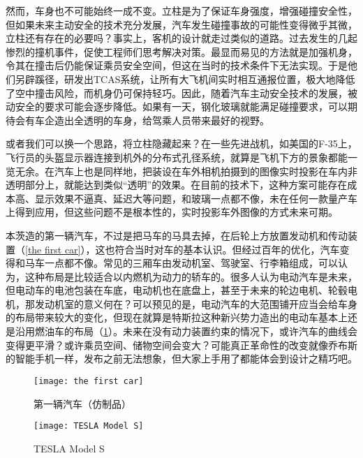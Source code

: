 \documentclass[UTF8]{ctexart}
\numberwithin{figure}{section}
\numberwithin{table}{section}
\begin{document}
然而，车身也不可能始终一成不变。立柱是为了保证车身强度，增强碰撞安全性，但如果未来主动安全的技术充分发展，汽车发生碰撞事故的可能性变得微乎其微，立柱还有存在的必要吗？事实上，客机的设计就走过类似的道路。过去发生的几起惨烈的撞机事件，促使工程师们思考解决对策。最显而易见的方法就是加强机身，令其在撞击后仍能保证乘员安全空间，但这在当时的技术条件下无法实现。于是他们另辟蹊径，研发出TCAS系统，让所有大飞机间实时相互通报位置，极大地降低了空中撞击风险，而机身仍可保持轻巧。因此，随着汽车主动安全技术的发展，被动安全的要求可能会逐步降低。如果有一天，钢化玻璃就能满足碰撞要求，可以期待会有车企造出全透明的车身，给驾乘人员带来最好的视野。

或者我们可以换一个思路，将立柱隐藏起来？在一些先进战机，如美国的F-35上，飞行员的头盔显示器连接到机外的分布式孔径系统，就算是飞机下方的景象都能一览无余。在汽车上也是同样地，把装设在车外相机拍摄到的图像实时投影在车内非透明部分上，就能达到类似“透明”的效果。在目前的技术下，这种方案可能存在成本高、显示效果不逼真、延迟大等问题，和玻璃一点都不像，未在任何一款量产车上得到应用，但这些问题不是根本性的，实时投影车外图像的方式未来可期。

本茨造的第一辆汽车，不过是把马车的马具去掉，在后轮上方放置发动机和传动装置（\cref{the first car}），这也符合当时对车的基本认识。但经过百年的优化，汽车变得和马车一点都不像。常见的三厢车由发动机室、驾驶室、行李箱组成，可以认为，这种布局是比较适合以内燃机为动力的轿车的。很多人认为电动汽车是未来，但电动车的电池包装在车底，电动机也在底盘上，甚至于未来的轮边电机、轮毂电机，那发动机室的意义何在？可以预见的是，电动汽车的大范围铺开应当会给车身的布局带来较大的变化，但现在就算是特斯拉这种新兴势力造出的电动车基本上还是沿用燃油车的布局（\cref{TESLA Model S}）。未来在没有动力装置约束的情况下，或许汽车的曲线会变得更平滑？或许乘员空间、储物空间会变大？可能真正革命性的改变就像乔布斯的智能手机一样，发布之前无法想象，但大家上手用了都能体会到设计之精巧吧。

\begin{figure}[htbp]
	\begin{minipage}[b]{0.4\textwidth}
		\centering
		\texttt{[image: the first car]}
		\caption{第一辆汽车（仿制品）}
		\label{the first car}
	\end{minipage}
	\begin{minipage}[b]{0.55\textwidth}
		\centering
		\texttt{[image: TESLA Model S]}
		\caption{TESLA Model S}
		\label{TESLA Model S}
	\end{minipage}
\end{figure}

\newpage
\end{document}
